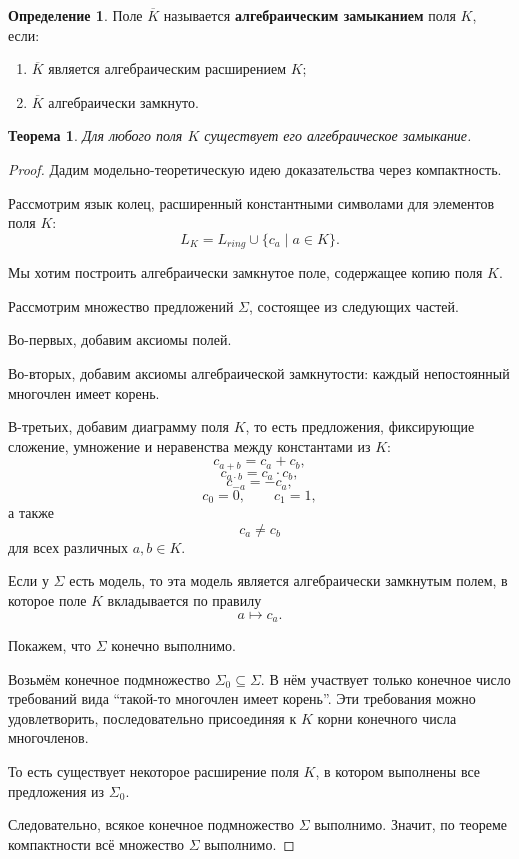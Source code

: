 \documentclass[12pt,a4paper,oneside,openany]{book}
\theoremstyle{definition}
\newtheorem{definition}{Определение}[chapter]
\theoremstyle{plain}
\newtheorem{theorem}{Теорема}[chapter]
\theoremstyle{remark}
\begin{document}
\begin{definition}
Поле $\overline K$ называется \textbf{алгебраическим замыканием} поля $K$, если:
\begin{enumerate}
    \item $\overline K$ является алгебраическим расширением $K$;
    \item $\overline K$ алгебраически замкнуто.
\end{enumerate}
\end{definition}

\begin{theorem}
Для любого поля $K$ существует его алгебраическое замыкание.
\end{theorem}

\begin{proof}
Дадим модельно-теоретическую идею доказательства через компактность.

Рассмотрим язык колец, расширенный константными символами для элементов поля $K$:
\[
L_K=L_{ring}\cup\{c_a\mid a\in K\}.
\]

Мы хотим построить алгебраически замкнутое поле, содержащее копию поля $K$.

Рассмотрим множество предложений $\Sigma$, состоящее из следующих частей.

Во-первых, добавим аксиомы полей.

Во-вторых, добавим аксиомы алгебраической замкнутости: каждый непостоянный многочлен имеет корень.

В-третьих, добавим диаграмму поля $K$, то есть предложения, фиксирующие сложение, умножение и неравенства между константами из $K$:
\[
c_{a+b}=c_a+c_b,
\]
\[
c_{a\cdot b}=c_a\cdot c_b,
\]
\[
c_{-a}=-c_a,
\]
\[
c_0=0,
\qquad
c_1=1,
\]
а также
\[
c_a\ne c_b
\]
для всех различных $a,b\in K$.

Если у $\Sigma$ есть модель, то эта модель является алгебраически замкнутым полем, в которое поле $K$ вкладывается по правилу
\[
a\mapsto c_a.
\]

Покажем, что $\Sigma$ конечно выполнимо.

Возьмём конечное подмножество $\Sigma_0\subseteq\Sigma$. В нём участвует только конечное число требований вида ``такой-то многочлен имеет корень''. Эти требования можно удовлетворить, последовательно присоединяя к $K$ корни конечного числа многочленов.

То есть существует некоторое расширение поля $K$, в котором выполнены все предложения из $\Sigma_0$.

Следовательно, всякое конечное подмножество $\Sigma$ выполнимо. Значит, по теореме компактности всё множество $\Sigma$ выполнимо.


\end{proof}
\end{document}
